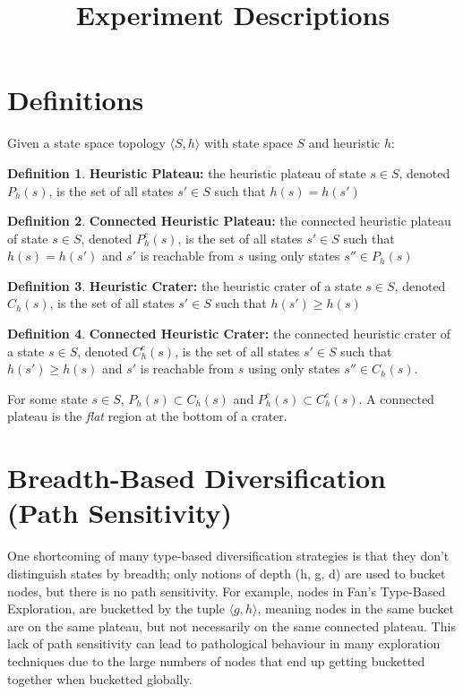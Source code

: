 \documentclass{article}
\title{Experiment Descriptions}
\author{}
\date{}
\theoremstyle{definition}
\newtheorem{definition}{Definition}[section]
\begin{document}
\maketitle
\pagestyle{plain}

\section{Definitions}
Given a state space topology $\langle S, h \rangle$ with state space $S$ and heuristic $h$: 
\begin{definition}
    \textbf{Heuristic Plateau:} the heuristic plateau of state $s \in S$, denoted $P_h(s)$, is the set of all states $s' \in S$ such that $h(s) = h(s')$
\end{definition}

\begin{definition}
    \textbf{Connected Heuristic Plateau:} the connected heuristic plateau of state $s \in S$, denoted $P^c_h(s)$, is the set of all states $s' \in S$ such that $h(s) = h(s')$ and $s'$ is reachable from $s$ using only states $s'' \in P_h(s)$
\end{definition}

\begin{definition}
    \textbf{Heuristic Crater:} the  heuristic crater of a state $s \in S$, denoted $C_h(s)$, is the set of all states $s' \in S$ such that $h(s') \geq h(s)$
\end{definition}

\begin{definition}
    \textbf{Connected Heuristic Crater:} the connected heuristic crater of a state $s \in S$, denoted $C^c_h(s)$, is the set of all states $s' \in S$ such that $h(s') \geq h(s)$ and $s'$ is reachable from $s$ using only states $s'' \in C_h(s)$. 
\end{definition}

For some state $s \in S$, $P_h(s) \subset C_h(s)$ and $P^c_h(s) \subset C^c_h(s)$. A connected plateau is the \textit{flat} region at the bottom of a crater. 

\section{Breadth-Based Diversification (Path Sensitivity)}
One shortcoming of many type-based diversification strategies is that they don't distinguish states by breadth; only notions of depth (h, g, d) are used to bucket nodes, but there is no path sensitivity. For example, nodes in Fan's Type-Based Exploration, are bucketted by the tuple $\langle g, h \rangle$, meaning nodes in the same bucket are on the same plateau, but not necessarily on the same connected plateau. This lack of path sensitivity can lead to pathological behaviour in many exploration techniques due to the large numbers of nodes that end up getting bucketted together when bucketted globally. 
\end{document}
